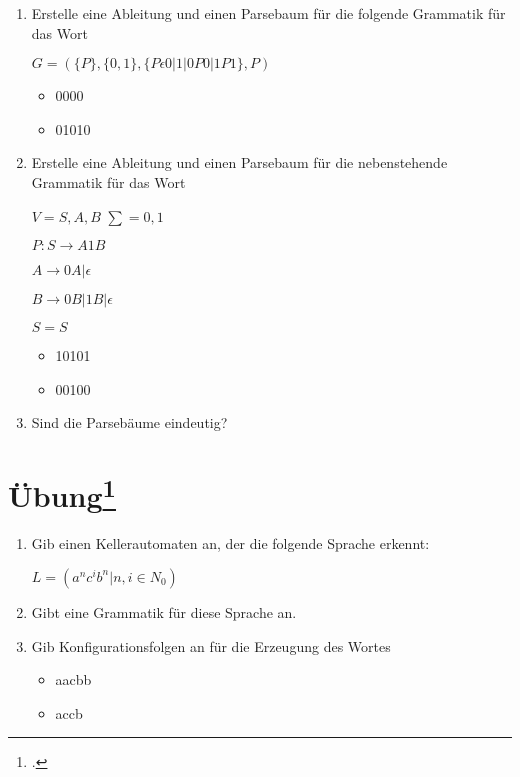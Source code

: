 \documentclass{lehramt-informatik-aufgabe}
\begin{document}
\begin{enumerate}
\item Erstelle eine Ableitung und einen Parsebaum für die folgende
Grammatik für das Wort

$G = ( \{P\} , \{0,1\}, \{P \epsilon  0 | 1 | 0P0 | 1P1\}, P)$

\begin{itemize}
\item 0000
\item 01010
\end{itemize}

\item Erstelle eine Ableitung und einen Parsebaum für die nebenstehende
Grammatik für das Wort

$V = {S, A, B}$
$∑= {0,1}$

$P: S \rightarrow A1B$

$A \rightarrow 0A | \epsilon$

$B \rightarrow 0B | 1B | \epsilon$

$S = S$

\begin{itemize}
\item 10101
\item 00100
\end{itemize}

\item Sind die Parsebäume eindeutig?
\end{enumerate}

%

\section{Übung\footcite[Seite 25]{theo:fs:2}}

\begin{enumerate}
\item Gib einen Kellerautomaten an, der die folgende Sprache erkennt:

$L = (a^n c^i b^n | n, i \in N_0 )$

\item Gibt eine Grammatik für diese Sprache an.

\item Gib Konfigurationsfolgen an für die Erzeugung des Wortes

\begin{itemize}
\item aacbb
\item accb
\end{itemize}

\end{enumerate}
\end{document}
